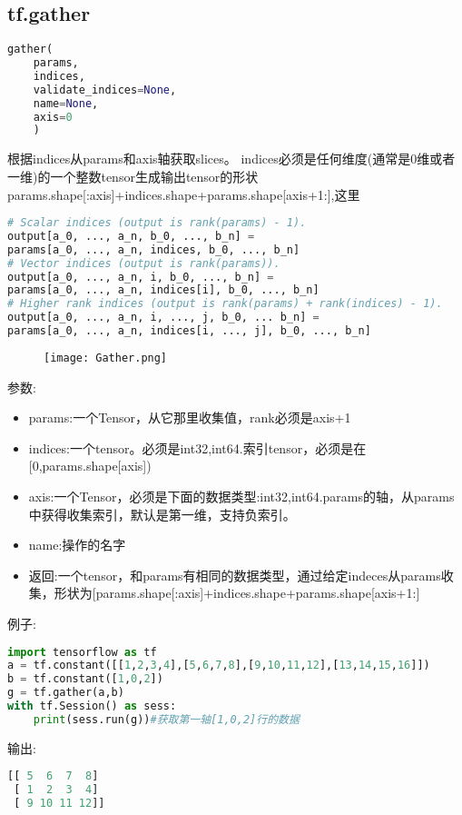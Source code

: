 \subsection{tf.gather}
\begin{lstlisting}[language=Python]
gather(
    params,
    indices,
    validate_indices=None,
    name=None,
    axis=0
	)
\end{lstlisting}
根据indices从params和axis轴获取slices。
indices必须是任何维度(通常是0维或者一维)的一个整数tensor生成输出tensor的形状params.shape[:axis]+indices.shape+params.shape[axis+1:],这里
\begin{lstlisting}[language=Python]
# Scalar indices (output is rank(params) - 1).
output[a_0, ..., a_n, b_0, ..., b_n] =
params[a_0, ..., a_n, indices, b_0, ..., b_n]
# Vector indices (output is rank(params)).
output[a_0, ..., a_n, i, b_0, ..., b_n] =
params[a_0, ..., a_n, indices[i], b_0, ..., b_n]
# Higher rank indices (output is rank(params) + rank(indices) - 1).
output[a_0, ..., a_n, i, ..., j, b_0, ... b_n] =
params[a_0, ..., a_n, indices[i, ..., j], b_0, ..., b_n]
\end{lstlisting}
\begin{figure}[H]
	\texttt{[image: Gather.png]}
\end{figure}
参数:
\begin{itemize}
	\item params:一个Tensor，从它那里收集值，rank必须是axis+1
	\item indices:一个tensor。必须是int32,int64.索引tensor，必须是在[0,params.shape[axis])
	\item axis:一个Tensor，必须是下面的数据类型:int32,int64.params的轴，从params中获得收集索引，默认是第一维，支持负索引。
	\item name:操作的名字
	\item{返回}:一个tensor，和params有相同的数据类型，通过给定indeces从params收集，形状为[params.shape[:axis]+indices.shape+params.shape[axis+1:]
\end{itemize}
例子:
\begin{lstlisting}[language=Python]
import tensorflow as tf
a = tf.constant([[1,2,3,4],[5,6,7,8],[9,10,11,12],[13,14,15,16]])
b = tf.constant([1,0,2])
g = tf.gather(a,b)
with tf.Session() as sess:
    print(sess.run(g))#获取第一轴[1,0,2]行的数据
\end{lstlisting}
输出:
\begin{lstlisting}[language=Python]
[[ 5  6  7  8]
 [ 1  2  3  4]
 [ 9 10 11 12]]
\end{lstlisting}
